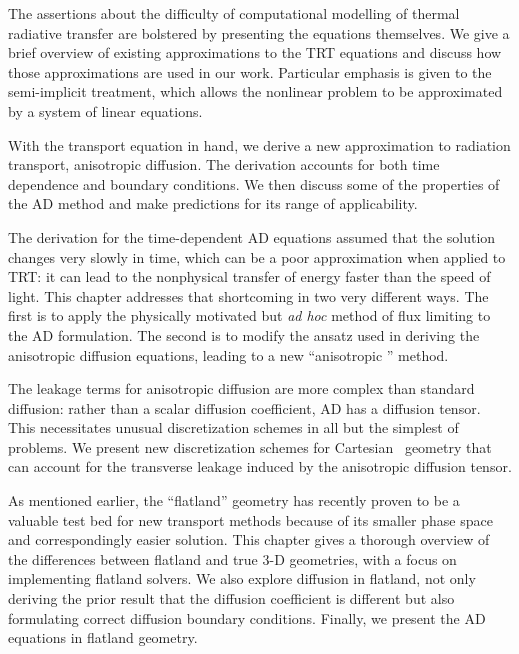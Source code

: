 The assertions about the difficulty of computational modelling of thermal
radiative transfer are bolstered by presenting the equations themselves. We give
a brief overview of existing approximations to the TRT equations and discuss how
those approximations are used in our work. Particular emphasis is given to the
semi-implicit treatment, which allows the nonlinear problem to be approximated
by a system of linear equations.

With the transport equation in hand, we derive a new approximation to radiation
transport, anisotropic diffusion. The derivation accounts for both time
dependence and boundary conditions. We then discuss some of the properties of
the AD method and make predictions for its range of applicability.

The derivation for the time-dependent AD equations assumed that the solution
changes very slowly in time, which can be a poor approximation when applied to
TRT: it can lead to the nonphysical transfer of energy faster than the speed of
light. This chapter addresses that shortcoming in two very different ways. The
first is to apply the physically motivated but \emph{ad hoc} method of flux
limiting to the AD formulation. The second is to modify the ansatz used in
deriving the anisotropic diffusion equations, leading to a new ``anisotropic
\Pone'' method.

The leakage terms for anisotropic diffusion are more complex than standard
diffusion: rather than a scalar diffusion coefficient, AD has a diffusion
tensor. This necessitates unusual discretization schemes in all but the simplest
of problems. We present new discretization schemes for Cartesian \xy\ geometry
that can account for the transverse leakage induced by the anisotropic diffusion
tensor.

As mentioned earlier, the ``flatland'' geometry has recently proven to be a
valuable test bed for new transport methods because of its smaller phase space
and correspondingly easier solution. This chapter gives a thorough overview of
the differences between flatland and true 3-D geometries, with a focus on
implementing flatland solvers. We also explore diffusion in flatland, not only
deriving the prior result that the diffusion coefficient is different but also
formulating correct diffusion boundary conditions. Finally, we present the AD
equations in flatland geometry.

